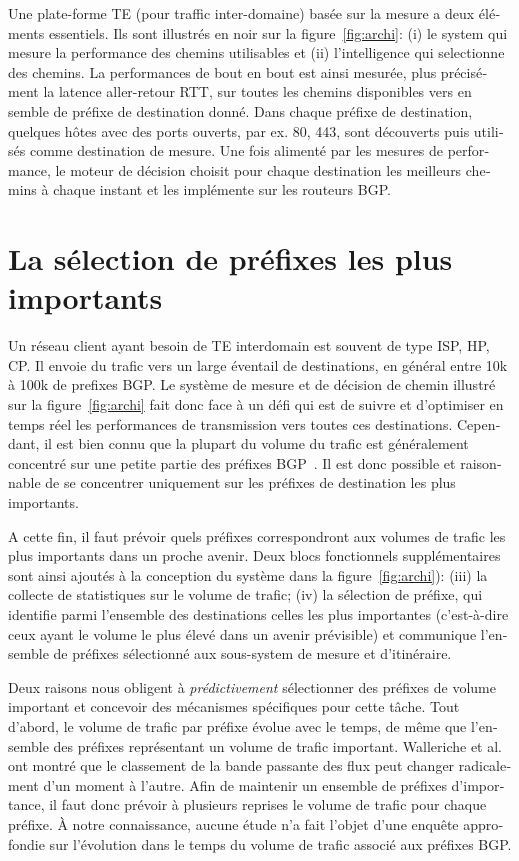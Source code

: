 \begin{otherlanguage}{french}
Une plate-forme TE (pour traffic inter-domaine) basée sur la mesure a deux éléments essentiels.
Ils sont illustrés en noir sur la figure~\ref{fig:archi}: (i) le system qui mesure la performance des chemins utilisables et 
(ii) l'intelligence qui selectionne des chemins.
La performances de bout en bout est ainsi mesurée, plus précisément la latence aller-retour \acf{RTT}, 
sur toutes les chemins disponibles vers en semble de préfixe de destination donné.
Dans chaque préfixe de destination, quelques hôtes avec des ports ouverts, par ex. 80, 443, sont découverts puis utilisés comme destination de mesure.
Une fois alimenté par les mesures de performance, le moteur de décision choisit pour chaque destination les meilleurs chemins à chaque instant et les implémente sur les routeurs BGP.

\section*{La sélection de préfixes les plus importants}

Un réseau client ayant besoin de \acf{TE} interdomain est souvent de type \acf{ISP}, \acf{HP}, \acf{CP}.
Il envoie du trafic vers un large éventail de destinations, en général entre 10k à 100k de prefixes BGP.
Le système de mesure et de décision de chemin illustré sur la figure~\ref{fig:archi} fait donc face à un défi 
qui est de suivre et d'optimiser en temps réel les performances de transmission vers toutes ces destinations.
Cependant, il est bien connu que la plupart du volume du trafic est généralement concentré sur une petite partie des préfixes BGP~\cite{Fang1999, Feamster2003, Papagiannaki2005, Sarrar2012}.
Il est donc possible et raisonnable de se concentrer uniquement sur les préfixes de destination les plus importants.

A cette fin, il faut prévoir quels préfixes correspondront aux volumes de trafic les plus importants dans un proche avenir.
Deux blocs fonctionnels supplémentaires sont ainsi ajoutés à la conception du système dans la figure~\ref {fig:archi}): (iii) la collecte de statistiques sur le volume de trafic; (iv) la sélection de préfixe, qui identifie parmi l'ensemble des destinations celles les plus importantes (c'est-à-dire ceux ayant le volume le plus élevé dans un avenir prévisible) et communique l'ensemble de préfixes sélectionné aux sous-system de mesure et d'itinéraire.

Deux raisons nous obligent à \textit{prédictivement} sélectionner des préfixes de volume important et concevoir des mécanismes spécifiques pour cette tâche.
Tout d'abord, le volume de trafic par préfixe évolue avec le temps, de même que l'ensemble des préfixes représentant un volume de trafic important.
Walleriche et al.~\cite{Wallerich2006} ont montré que le classement de la bande passante des flux peut changer radicalement d'un moment à l'autre.
Afin de maintenir un ensemble de préfixes d'importance, il faut donc prévoir à plusieurs reprises le volume de trafic pour chaque préfixe.
À notre connaissance, aucune étude n'a fait l'objet d'une enquête approfondie sur l'évolution dans le temps du volume de trafic associé aux préfixes BGP.


\end{otherlanguage}
